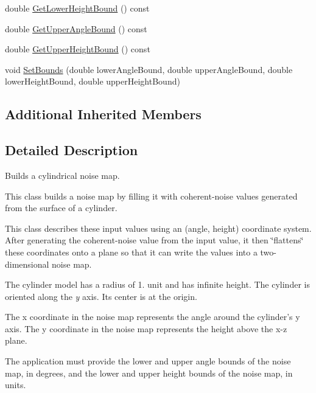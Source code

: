 \begin{DoxyCompactItemize}
double \hyperlink{classnoise_1_1utils_1_1_noise_map_builder_cylinder_ad2accfd3d9cf4fd851a8bc9ce332816a}{Get\+Lower\+Height\+Bound} () const 
\item 
double \hyperlink{classnoise_1_1utils_1_1_noise_map_builder_cylinder_ac29d2bd03c6d948e4e1ee7c27cbccfeb}{Get\+Upper\+Angle\+Bound} () const 
\item 
double \hyperlink{classnoise_1_1utils_1_1_noise_map_builder_cylinder_a7237ee50f47cdc53400a253595c7ff43}{Get\+Upper\+Height\+Bound} () const 
\item 
void \hyperlink{classnoise_1_1utils_1_1_noise_map_builder_cylinder_ab699795566901fef4c86dbf1db51ae3a}{Set\+Bounds} (double lower\+Angle\+Bound, double upper\+Angle\+Bound, double lower\+Height\+Bound, double upper\+Height\+Bound)
\end{DoxyCompactItemize}
\subsection*{Additional Inherited Members}


\subsection{Detailed Description}
Builds a cylindrical noise map.

This class builds a noise map by filling it with coherent-\/noise values generated from the surface of a cylinder.

This class describes these input values using an (angle, height) coordinate system. After generating the coherent-\/noise value from the input value, it then \char`\"{}flattens\char`\"{} these coordinates onto a plane so that it can write the values into a two-\/dimensional noise map.

The cylinder model has a radius of 1. unit and has infinite height. The cylinder is oriented along the {\itshape y} axis. Its center is at the origin.

The x coordinate in the noise map represents the angle around the cylinder's y axis. The y coordinate in the noise map represents the height above the x-\/z plane.

The application must provide the lower and upper angle bounds of the noise map, in degrees, and the lower and upper height bounds of the noise map, in units. 

